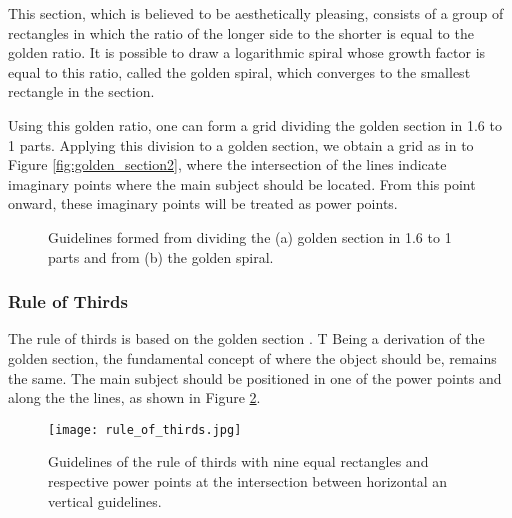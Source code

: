 This section, which is believed to be aesthetically pleasing, consists of a group of rectangles in which the ratio of the longer side to the shorter is equal to the golden ratio. It is possible to draw a logarithmic spiral whose growth factor is equal to this ratio, called the golden spiral, which converges to the smallest rectangle in the section. 

Using this golden ratio, one can form a grid dividing the golden section in 1.6 to 1 parts. Applying this division to a golden section, we obtain a grid as in to Figure \ref{fig:golden_section2}, where the intersection of the lines indicate imaginary points where the main subject should be located. From this point onward, these imaginary points will be treated as power points. 

\begin{figure}[htbp]
        \centering
  \caption{Guidelines formed from dividing the (a) golden section in 1.6 to 1 parts and from (b) the golden spiral.}
  \label{fig:golden_section_image}
\end{figure}

\subsubsection{Rule of Thirds}
\label{subsub:rule_thirds}

The rule of thirds is based on the golden section \cite{Santos}. T%
Being a derivation of the golden section, the fundamental concept of where the object should be, remains the same. The main subject should be positioned in one of the power points and along the the lines, as shown in Figure \ref{fig:rule_of_thirds_image}.

\begin{figure}[htbp]
    \centering
	\label{fig:rule_of_thirds_example}
    \texttt{[image: rule\_of\_thirds.jpg]}
	\caption{Guidelines of the rule of thirds with nine equal rectangles and respective power points at the intersection between horizontal an vertical guidelines.}
	\label{fig:rule_of_thirds_image}
\end{figure}

